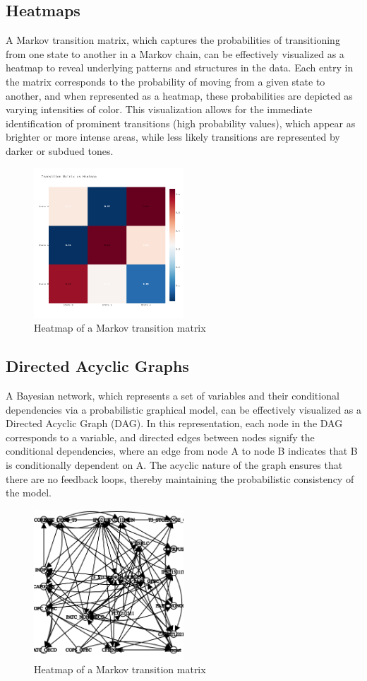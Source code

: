 \subsection{Heatmaps}
A Markov transition matrix, which captures the probabilities of transitioning from one state to another in a Markov chain, can be effectively visualized as a heatmap to reveal underlying patterns and structures in the data. Each entry in the matrix corresponds to the probability of moving from a given state to another, and when represented as a heatmap, these probabilities are depicted as varying intensities of color. This visualization allows for the immediate identification of prominent transitions (high probability values), which appear as brighter or more intense areas, while less likely transitions are represented by darker or subdued tones. \cite{genc2019optimal} 


\begin{figure}[H]
    \centering
    \includegraphics[width=0.5\textwidth]{images/heatmap.png}
    \caption{Heatmap of a Markov transition matrix}
    \label{fig:heatmap}
\end{figure}

\subsection{Directed Acyclic Graphs}
A Bayesian network, which represents a set of variables and their conditional dependencies via a probabilistic graphical model, can be effectively visualized as a Directed Acyclic Graph (DAG). In this representation, each node in the DAG corresponds to a variable, and directed edges between nodes signify the conditional dependencies, where an edge from node A to node B indicates that B is conditionally dependent on A. The acyclic nature of the graph ensures that there are no feedback loops, thereby maintaining the probabilistic consistency of the model. 


\begin{figure}[H]
    \centering
    \includegraphics[width=0.5\textwidth]{images/graph.png}
    \caption{Heatmap of a Markov transition matrix}
    \label{fig:heatmap}
\end{figure}

